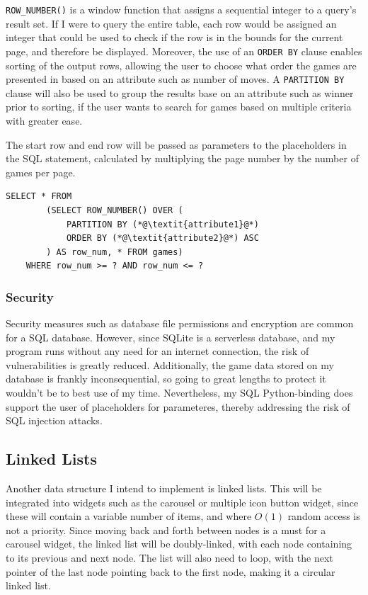 \documentclass[../main/main.tex]{subfiles}
\begin{document}
\lstinline[language=sqlite]{ROW_NUMBER()} is a window function that assigns a sequential integer to a query's result set. If I were to query the entire table, each row would be assigned an integer that could be used to check if the row is in the bounds for the current page, and therefore be displayed. Moreover, the use of an \lstinline[language=sqlite]{ORDER BY} clause enables sorting of the output rows, allowing the user to choose what order the games are presented in based on an attribute such as number of moves. A \lstinline[language=sqlite]{PARTITION BY} clause will also be used to group the results base on an attribute such as winner prior to sorting, if the user wants to search for games based on multiple criteria with greater ease.

The start row and end row will be passed as parameters to the placeholders in the SQL statement, calculated by multiplying the page number by the number of games per page.

\begin{lstlisting}[language=sqlite, frame=lines]
    SELECT * FROM
        (SELECT ROW_NUMBER() OVER (
            PARTITION BY (*@\textit{attribute1}@*)
            ORDER BY (*@\textit{attribute2}@*) ASC
        ) AS row_num, * FROM games)
    WHERE row_num >= ? AND row_num <= ?
\end{lstlisting}

\subsubsection*{Security}
Security measures such as database file permissions and encryption are common for a SQL database. However, since SQLite is a serverless database, and my program runs without any need for an internet connection, the risk of vulnerabilities is greatly reduced. Additionally, the game data stored on my database is frankly inconsequential, so going to great lengths to protect it wouldn't be to best use of my time. Nevertheless, my SQL Python-binding does support the user of placeholders for parameteres, thereby addressing the risk of SQL injection attacks.

\subsection{Linked Lists}
Another data structure I intend to implement is linked lists. This will be integrated into widgets such as the carousel or multiple icon button widget, since these will contain a variable number of items, and where $O(1)$ random access is not a priority. Since moving back and forth between nodes is a must for a carousel widget, the linked list will be doubly-linked, with each node containing to its previous and next node. The list will also need to loop, with the next pointer of the last node pointing back to the first node, making it a circular linked list.
\end{document}
